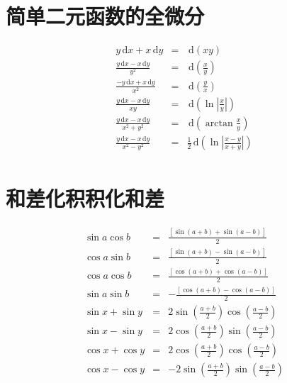\documentclass[UTF8]{ctexart}
\newcommand{\ud}{\,\mathrm{d}}
\begin{document}
\section{简单二元函数的全微分}
\begin{eqnarray*}
y\ud x + x\ud y&=& \ud(xy)\\
\frac{y\ud x - x\ud y}{y^2} &=& \ud(\frac{x}{y})\\
\frac{-y\ud x + x\ud y}{x^2} &=& \ud(\frac{y}{x})\\
\frac{y\ud x - x\ud y}{xy} &=& \ud(\ln|\frac{x}{y}|)\\
\frac{y\ud x - x\ud y}{x^2+y^2} &=& \ud(\arctan\frac{x}{y})\\
\frac{y\ud x - x\ud y}{x^2-y^2} &=& \frac{1}{2}\ud(\ln|\frac{x-y}{x+y}|)\\
\end{eqnarray*}



\section{和差化积积化和差}
\begin{eqnarray*}
\sin a \cos b&=&\frac{[\sin(a+b)+\sin(a-b)]}{2} \\
\cos a \sin b&=&\frac{[\sin(a+b)-\sin(a-b)]}{2} \\
\cos a \cos b&=&\frac{[\cos(a+b)+\cos(a-b)]}{2} \\
\sin a \sin b&=&-\frac{[\cos(a+b)-\cos(a-b)]}{2} \\
\sin x+\sin y&=&2\sin(\frac{a+b}{2})\cos(\frac{a-b}{2})\\
\sin x-\sin y&=&2\cos(\frac{a+b}{2})\sin(\frac{a-b}{2})\\
\cos x+\cos y&=&2\cos(\frac{a+b}{2})\cos(\frac{a-b}{2})\\
\cos x-\cos y&=&-2\sin(\frac{a+b}{2})\sin(\frac{a-b}{2})\\
\end{eqnarray*}
\end{document}
